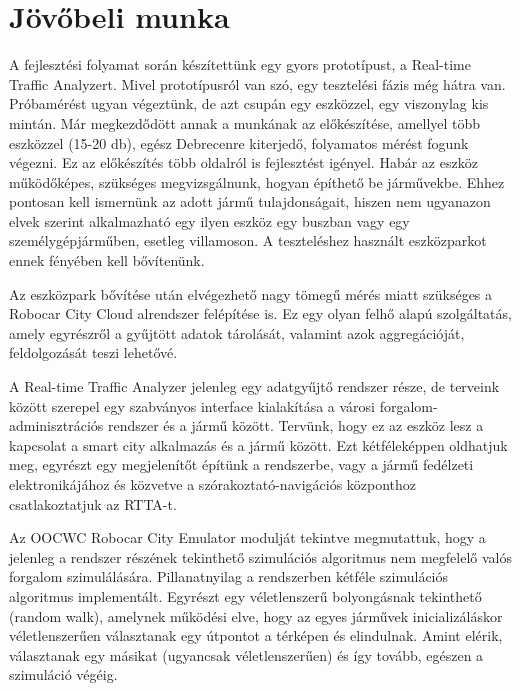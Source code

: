 \documentclass[a4paper,12pt]{report}
\begin{document}
\chapter{Jövőbeli munka}


A fejlesztési folyamat során készítettünk egy gyors prototípust, a Real-time Traffic Analyzert. Mivel prototípusról van szó, egy tesztelési fázis még hátra van. Próbamérést ugyan végeztünk, de azt csupán egy eszközzel, egy viszonylag kis mintán. Már megkezdődött annak a munkának az előkészítése, amellyel több eszközzel (15-20 db), egész Debrecenre kiterjedő, folyamatos mérést fogunk végezni. Ez az előkészítés több oldalról is fejlesztést igényel. Habár az eszköz működőképes, szükséges megvizsgálnunk, hogyan építhető be járművekbe. Ehhez pontosan kell ismernünk az adott jármű tulajdonságait, hiszen nem ugyanazon elvek szerint alkalmazható egy ilyen eszköz egy buszban vagy egy személygépjárműben, esetleg villamoson. A teszteléshez használt eszközparkot ennek fényében kell bővítenünk.

Az eszközpark bővítése után elvégezhető nagy tömegű mérés miatt szükséges a Robocar City Cloud alrendszer felépítése is. Ez egy olyan felhő alapú szolgáltatás, amely egyrészről a gyűjtött adatok tárolását, valamint azok aggregációját, feldolgozását teszi lehetővé.

A Real-time Traffic Analyzer jelenleg egy adatgyűjtő rendszer része, de terveink között szerepel egy szabványos interface kialakítása a városi forgalom-adminisztrációs rendszer és a jármű között. Tervünk, hogy ez az eszköz lesz a kapcsolat a smart city alkalmazás és a jármű között. Ezt kétféleképpen oldhatjuk meg, egyrészt egy megjelenítőt építünk a rendszerbe, vagy a jármű fedélzeti elektronikájához és közvetve a szórakoztató-navigációs központhoz csatlakoztatjuk az RTTA-t.

Az OOCWC Robocar City Emulator modulját tekintve megmutattuk, hogy a jelenleg a rendszer részének tekinthető szimulációs algoritmus nem megfelelő valós forgalom szimulálására. Pillanatnyilag a rendszerben kétféle szimulációs algoritmus implementált. Egyrészt egy véletlenszerű bolyongásnak tekinthető (random walk), amelynek működési elve, hogy az egyes járművek inicializáláskor véletlenszerűen választanak egy útpontot a térképen és elindulnak. Amint elérik, választanak egy másikat (ugyancsak véletlenszerűen) és így tovább, egészen a szimuláció végéig. 
\end{document}
